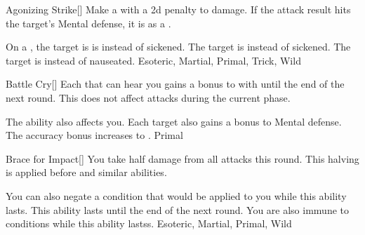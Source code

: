 
\lowercase{\hypertarget{maneuver:Agonizing Strike}{}}\label{maneuver:Agonizing Strike}
\hypertarget{maneuver:Agonizing Strike}{}
\begin{freeability}{Agonizing Strike}[]
Make a  with a \minus2d penalty to damage.
If the attack result hits the target's Mental defense,
it is  as a .

\rankline
{} On a , the target is is  instead of sickened.
 The target is  instead of sickened.
 The target is  instead of nauseated.
 Esoteric, Martial, Primal, Trick, Wild
\end{freeability}
\vspace{0.25em}



\lowercase{\hypertarget{maneuver:Battle Cry}{}}\label{maneuver:Battle Cry}
\hypertarget{maneuver:Battle Cry}{}
\begin{freeability}{Battle Cry}[]
Each  that can hear you gains a  bonus to  with  until the end of the next round.
This does not affect attacks during the current phase.

\rankline
{} The ability also affects you.
 Each target also gains a  bonus to Mental defense.
 The accuracy bonus increases to .
 Primal
\end{freeability}
\vspace{0.25em}



\lowercase{\hypertarget{maneuver:Brace for Impact}{}}\label{maneuver:Brace for Impact}
\hypertarget{maneuver:Brace for Impact}{}
\begin{freeability}{Brace for Impact}[]
You take half damage from all attacks this round.
This halving is applied before  and similar abilities.

\rankline
{} You can also negate a condition that would be applied to you while this ability lasts.
 This ability lasts until the end of the next round.
 You are also immune to conditions while this ability lastss.
 Esoteric, Martial, Primal, Wild
\end{freeability}
\vspace{0.25em}




